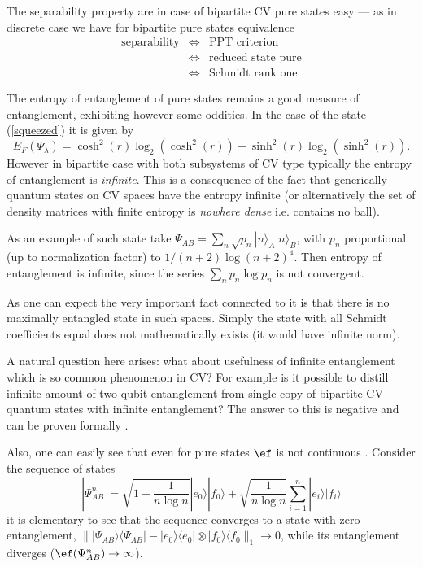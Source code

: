 \documentclass[rmp,12pt,preprint]{revtex4-2}
\begin{document}
The separability property are in case of bipartite CV pure states easy
--- as in discrete case we have for bipartite pure states equivalence
\begin{eqnarray}
\textrm{separability} &\Leftrightarrow& \textrm{PPT criterion} \nonumber \\
& \Leftrightarrow& \textrm{reduced state pure} \nonumber \\
&\Leftrightarrow& \textrm{Schmidt rank one}
\end{eqnarray}


The entropy of entanglement of pure states remains a good measure of
entanglement, exhibiting however some oddities. In the case of the
state (\ref{squeezed}) it is given by
\cite{GaussianEoF,GaussianEoFPRA}
\begin{equation}
E_{F}(\Psi_\lambda)= \cosh^2(r)\log_2(\cosh^2(r)) - \sinh^2(r)
\log_2(\sinh^2(r)).
\end{equation}
However in bipartite case with both subsystems of CV type typically
the entropy of entanglement is {\it infinite}.  This is a consequence
of the fact that generically quantum states on CV spaces have the
entropy infinite \cite{Wehrl} (or alternatively the set of density
matrices with finite entropy is {\it nowhere dense} i.e. contains no
ball).

As an example of such state take $\Psi_{AB}=\sum_{n} \sqrt{p_{n}}
|n\rangle_{A}|n\rangle_{B}$, with $p_{n}$ proportional (up to
normalization factor) to ${1}/{(n+2) \log(n + 2)^{4}}$. Then entropy
of entanglement is infinite, since the series $\sum_{n}p_{n} \log
p_{n}$ is not convergent.

As one can expect the very important fact connected to it is that
there is no maximally entangled state in such spaces. Simply the state
with all Schmidt coefficients equal does not mathematically exists (it
would have infinite norm).

A natural question here arises: what about usefulness of infinite
entanglement which is so common phenomenon in CV?  For example is it
possible to distill infinite amount of two-qubit entanglement from
single copy of bipartite CV quantum states with infinite entanglement?
The answer to this is negative and can be proven formally
\cite{InfiniteEntanglementKeyl}.

Also, one can easily see that even for pure states $\ef$ is not
continuous \cite{InfiniteEntanglementEisert}. Consider the sequence of
states
\begin{equation}
|\Psi_{AB}^{n}\>=\sqrt{1-\frac{1}{n\log n}} |e_{0}\rangle |f_{0}\rangle
+ \sqrt{\frac{1}{n \log n}} \sum_{i=1}^{n}| e_{i} \rangle
|f_{i}\rangle
\end{equation}
it is elementary to see that the sequence converges to a state with
zero entanglement, $\| |\Psi_{AB}\rangle \langle\Psi_{AB}| -
|e_{0}\rangle\langle e_{0}| \otimes
 |f_{0}\rangle\langle f_{0} \|_1 \rightarrow 0$,
while its entanglement diverges ($\ef(\Psi_{AB}^{n})\rightarrow
\infty$).
\end{document}
